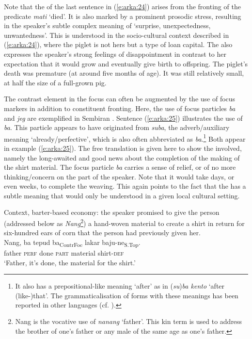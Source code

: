 \documentclass[output=paper
,modfonts
,nonflat]{langsci/langscibook}
\begin{document}
\noindent
Note that the  of the last sentence in (\ref{e:arka:24}) arises from the fronting of the predicate \textit{mati} ‘died’. It is also marked by a prominent prosodic stress, resulting in the speaker's subtle complex meaning of ‘surprise, unexpectedness, unwantedness’. This is understood in the socio-cultural context described in (\ref{e:arka:24}), where the piglet is not hers but a type of loan capital. The  also expresses the speaker’s strong feelings of disappointment in contrast to her expectation that it would grow and eventually give birth to offspring. The piglet’s death was premature (at around five months of age). It was still relatively small, at half the size of a full-grown pig.  

The contrast element in the focus can often be augmented by the use of focus markers in addition to constituent fronting. Here, the use of focus particles \textit{ba} and \textit{jeg} are exemplified in Sembiran . Sentence (\ref{e:arka:25}) illustrates the use of \textit{ba}. This particle appears to have originated from \textit{suba}, the adverb/auxiliary meaning ‘already/perfective’, which is also often abbreviated as \textit{ba}.\footnote{It also has a prepositional-like meaning ‘after’ as in (\textit{su})\textit{ba kento} ‘after (like-)that’. The grammaticalisation of forms with these meanings has been reported in other languages (cf. \citealt[17, 134]{Heine2002}).} Both appear in example (\ref{e:arka:25}). The free translation is given here to show the  involved, namely the long-awaited and good news about the completion of the making of the shirt material. The focus particle \textit{ba} carries a sense of relief, or of no more thinking/concern on the part of the speaker. Note that it would take days, or even weeks, to complete the weaving. This again points to the fact that the  has a subtle meaning that would only be understood in a given local cultural setting. 

\begin{exe}
		\ex\label{e:arka:25}{Context, barter-based economy: the speaker promised to give the person (addressed below as \textit{Nang}\footnote{Nang is the vocative use of \textit{nanang} ‘father’. This kin term is used to address the brother of one’s father or any male of the same age as one’s father.}) a hand-woven material to create a shirt in return for six-hundred ears of corn that the person had previously given her.}\\
		\gll Nang,   {\ob}ba   tepud   ba{\cb}\textsubscript{ContrFoc}  {\ob}lakar   baju-ne{\cb}\textsubscript{S.Top}.\\
		father  \phantom{[}\textsc{perf}  done  \textsc{part}  \phantom{[}material  shirt-\textsc{def}\\
		\glt ‘Father, it’s done, the material for the shirt.’
\end{exe}
\end{document}

